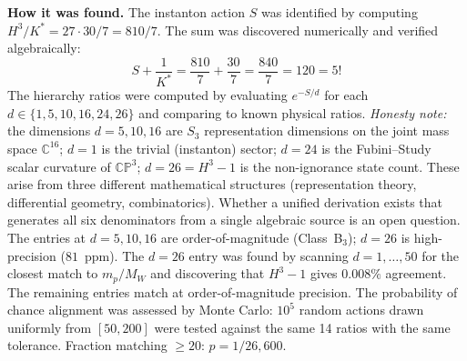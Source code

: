 \documentclass[11pt,a4paper]{article}
\theoremstyle{definition}
\theoremstyle{remark}
\newcommand{\CP}{\mathbb{CP}}
\newcommand{\C}{\mathbb{C}}
\begin{document}
\textbf{How it was found.} The instanton action $S$ was identified by computing $H^3/K^* = 27 \cdot 30/7 = 810/7$. The sum was discovered numerically and verified algebraically:
\[
S + \frac{1}{K^*} = \frac{810}{7} + \frac{30}{7} = \frac{840}{7} = 120 = 5!
\]
The hierarchy ratios were computed by evaluating $e^{-S/d}$ for each $d \in \{1, 5, 10, 16, 24, 26\}$ and comparing to known physical ratios. \emph{Honesty note:} the dimensions $d=5,10,16$ are $S_3$ representation dimensions on the joint mass space $\C^{16}$; $d=1$ is the trivial (instanton) sector; $d=24$ is the Fubini--Study scalar curvature of $\CP^3$; $d=26=H^3-1$ is the non-ignorance state count. These arise from three different mathematical structures (representation theory, differential geometry, combinatorics). Whether a unified derivation exists that generates all six denominators from a single algebraic source is an open question. The entries at $d=5,10,16$ are order-of-magnitude (Class~B$_3$); $d=26$ is high-precision ($81$~ppm). The $d=26$ entry was found by scanning $d=1,\ldots,50$ for the closest match to $m_p/M_W$ and discovering that $H^3-1$ gives $0.008\%$ agreement. The remaining entries match at order-of-magnitude precision. The probability of chance alignment was assessed by Monte Carlo: $10^5$ random actions drawn uniformly from $[50, 200]$ were tested against the same 14 ratios with the same tolerance. Fraction matching $\geq 20$: $p = 1/26{,}600$.
\end{document}
